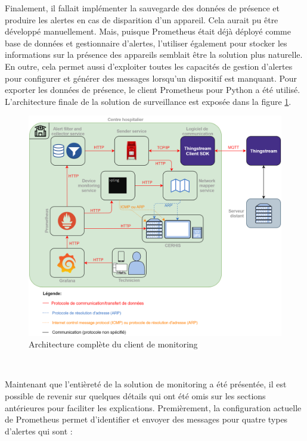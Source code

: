 \noindent
Finalement, il fallait implémenter la sauvegarde des données de présence et produire les alertes en cas de disparition d'un appareil. Cela aurait pu être développé manuellement. Mais, puisque Prometheus était déjà déployé comme base de données et gestionnaire d'alertes, l'utiliser également pour stocker les informations sur la présence des appareils semblait être la solution plus naturelle. En outre, cela permet aussi d'exploiter toutes les capacités de gestion d'alertes pour configurer et générer des messages lorsqu'un dispositif est manquant. Pour exporter les données de présence, le client Prometheus pour Python a été utilisé. L'architecture finale de la solution de surveillance est exposée dans la figure \ref{fig:arch_final}.


\begin{figure}[ht!]
  \centering
  \includegraphics[width=\textwidth]{img/app/arch_complete.png}
  \caption{Architecture complète du client de monitoring}
  \label{fig:arch_final}
\end{figure}


~

\newpage

\noindent
Maintenant que l'entièreté de la solution de monitoring a été présentée, il est possible de revenir sur quelques détails qui ont été omis sur les sections antérieures pour faciliter les explications. Premièrement, la configuration actuelle de Prometheus permet d'identifier et envoyer des messages pour quatre types d'alertes qui sont :

